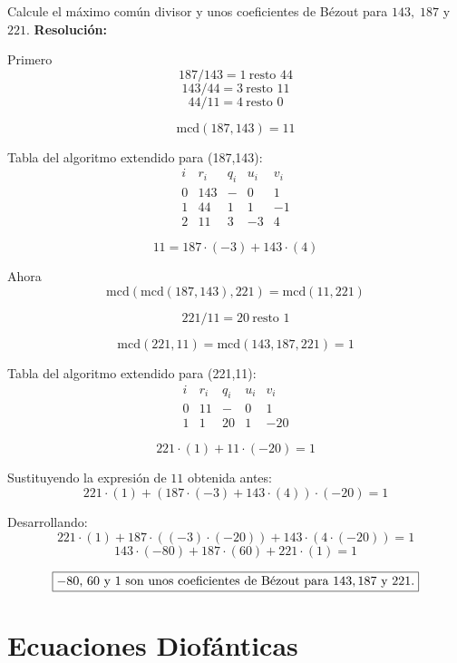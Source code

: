\documentclass[a4paper,12pt]{article}
\begin{document}
\begin{ejercicio}[title=Ejercicio 8]
Calcule el máximo común divisor y unos coeficientes de Bézout para $143,\;187$ y $221$.
\tcblower
\textbf{Resolución:}

Primero
\[
187 / 143 = 1 \ \text{resto } 44
\]
\[
143 / 44 = 3 \ \text{resto } \boxed{11}
\]
\[
44 / 11 = 4 \ \text{resto } 0
\]

\[
\text{mcd}(187,143) = \boxed{11}
\]

Tabla del algoritmo extendido para (187,143):
\[
\begin{array}{c|c|c|c|c}
i & r_i & q_i & u_i & v_i\\
\hline
0 & 143 & - & 0 & 1\\
1 & 44  & 1 & 1 & -1\\
2 & \boxed{11} & 3 & -3 & 4
\end{array}
\]

\[
\boxed{11} = 187 \cdot (-3) + 143 \cdot (4)
\]

Ahora
\[
\text{mcd}(\text{mcd}(187,143),221) = \text{mcd}(11,221)
\]

\[
221 / 11 = 20 \ \text{resto } \boxed{1}
\]

\[
\text{mcd}(221,11) = \boxed{\text{mcd}(143, 187, 221) = 1}
\]

Tabla del algoritmo extendido para (221,11):
\[
\begin{array}{c|c|c|c|c}
i & r_i & q_i & u_i & v_i\\
\hline
0 & 11 & - & 0 & 1\\
1 & \boxed{1} & 20 & 1 & -20
\end{array}
\]

\[
221 \cdot (1) + 11 \cdot (-20) = \boxed{1}
\]

Sustituyendo la expresión de $11$ obtenida antes:
\[
221 \cdot (1) + (187 \cdot (-3) + 143 \cdot (4)) \cdot (-20) = \boxed{1}
\]

Desarrollando:
\[
221 \cdot (1) + 187 \cdot ((-3)\cdot(-20)) + 143 \cdot (4\cdot(-20)) = \boxed{1}
\]
\[
143\cdot(-80) + 187\cdot(60) + 221\cdot(1) = \boxed{1}
\]

\[
\boxed{\text{$-80$, 60 y 1 son unos coeficientes de Bézout para 143,\,187 y 221.}}
\]

\end{ejercicio}

\section{Ecuaciones Diofánticas}
\end{document}
